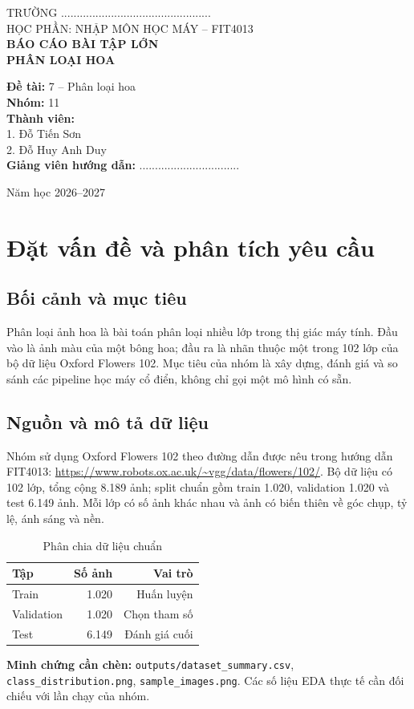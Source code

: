 \documentclass[12pt,a4paper]{report}
\begin{document}
\begin{titlepage}
\centering
{\large TRƯỜNG ................................................}\\[1cm]
{\large HỌC PHẦN: NHẬP MÔN HỌC MÁY -- FIT4013}\\[2cm]
{\Large\bfseries BÁO CÁO BÀI TẬP LỚN}\\[0.8cm]
{\huge\bfseries PHÂN LOẠI HOA}\\[1.5cm]
\begin{flushleft}
\textbf{Đề tài:} 7 -- Phân loại hoa\\
\textbf{Nhóm:} 11\\
\textbf{Thành viên:}\\
1. Đỗ Tiến Sơn\\
2. Đỗ Huy Anh Duy\\[0.5cm]
\textbf{Giảng viên hướng dẫn:} ................................
\end{flushleft}
\vfill
{\large Năm học 2026--2027}
\end{titlepage}

\tableofcontents
\chapter{Đặt vấn đề và phân tích yêu cầu}
\section{Bối cảnh và mục tiêu}
Phân loại ảnh hoa là bài toán phân loại nhiều lớp trong thị giác máy tính. Đầu vào là ảnh màu của một bông hoa; đầu ra là nhãn thuộc một trong 102 lớp của bộ dữ liệu Oxford Flowers 102. Mục tiêu của nhóm là xây dựng, đánh giá và so sánh các pipeline học máy cổ điển, không chỉ gọi một mô hình có sẵn.

\section{Nguồn và mô tả dữ liệu}
Nhóm sử dụng Oxford Flowers 102 theo đường dẫn được nêu trong hướng dẫn FIT4013: \url{https://www.robots.ox.ac.uk/~vgg/data/flowers/102/}. Bộ dữ liệu có 102 lớp, tổng cộng 8.189 ảnh; split chuẩn gồm train 1.020, validation 1.020 và test 6.149 ảnh. Mỗi lớp có số ảnh khác nhau và ảnh có biến thiên về góc chụp, tỷ lệ, ánh sáng và nền.
\begin{table}[H]\centering
\caption{Phân chia dữ liệu chuẩn}
\begin{tabular}{lrr}\toprule
Tập & Số ảnh & Vai trò\\\midrule
Train & 1.020 & Huấn luyện\\
Validation & 1.020 & Chọn tham số\\
Test & 6.149 & Đánh giá cuối\\\bottomrule
\end{tabular}
\end{table}
\textbf{Minh chứng cần chèn:} \texttt{outputs/dataset\_summary.csv}, \texttt{class\_distribution.png}, \texttt{sample\_images.png}. Các số liệu EDA thực tế cần đối chiếu với lần chạy của nhóm.
\end{document}
